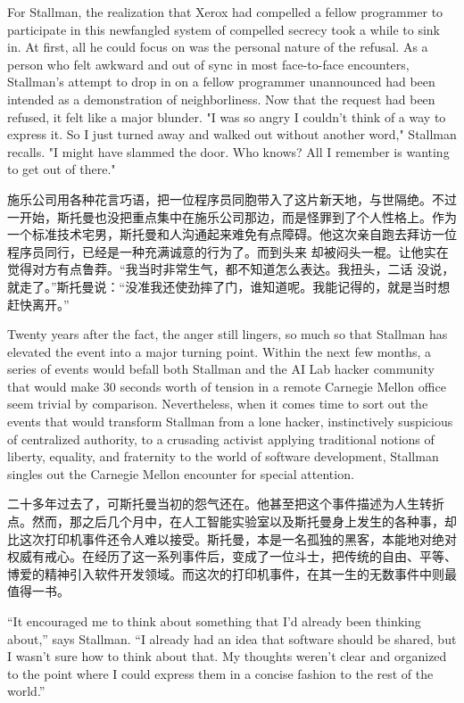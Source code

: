 \ifdefined\eng
For Stallman, the realization that Xerox had compelled a fellow programmer to participate in this newfangled system of compelled secrecy took a while to sink in. At first, all he could focus on was the personal nature of the refusal. As a person who felt awkward and out of sync in most face-to-face encounters, Stallman's attempt to drop in on a fellow programmer unannounced had been intended as a demonstration of neighborliness. Now that the request had been refused, it felt like a major blunder. "I was so angry I couldn't think of a way to express it. So I just turned away and walked out without another word," Stallman recalls. "I might have slammed the door. Who knows? All I remember is wanting to get out of there."
\fi

\ifdefined\chs
施乐公司用各种花言巧语，把一位程序员同胞带入了这片新天地，与世隔绝。不过一开始，斯托曼也没把重点集中在施乐公司那边，而是怪罪到了个人性格上。作为一个标准技术宅男，斯托曼和人沟通起来难免有点障碍。他这次亲自跑去拜访一位程序员同行，已经是一种充满诚意的行为了。而到头来
却被闷头一棍。让他实在觉得对方有点鲁莽。``我当时非常生气，都不知道怎么表达。我扭头，二话
没说，就走了。''斯托曼说：``没准我还使劲摔了门，谁知道呢。我能记得的，就是当时想赶快离开。''
\fi

\ifdefined\eng
Twenty years after the fact, the anger still lingers, so much so that Stallman has elevated the event into a major turning point. Within the next few months, a series of events would befall both Stallman and the AI Lab hacker community that would make 30 seconds worth of tension in a remote Carnegie Mellon office seem trivial by comparison. Nevertheless, when it comes time to sort out the events that would transform Stallman from a lone hacker, instinctively suspicious of centralized authority, to a crusading activist applying traditional notions of liberty, equality, and fraternity to the world of software development, Stallman singles out the Carnegie Mellon encounter for special attention.
\fi

\ifdefined\chs
二十多年过去了，可斯托曼当初的怨气还在。他甚至把这个事件描述为人生转折点。然而，那之后几个月中，在人工智能实验室以及斯托曼身上发生的各种事，却比这次打印机事件还令人难以接受。斯托曼，本是一名孤独的黑客，本能地对绝对权威有戒心。在经历了这一系列事件后，变成了一位斗士，把传统的自由、平等、博爱的精神引入软件开发领域。而这次的打印机事件，在其一生的无数事件中则最值得一书。
\fi

\ifdefined\eng
``It encouraged me to think about something that I'd already been thinking
about,'' says Stallman. ``I already had an idea that software should be shared,
but I wasn't sure how to think about that. My thoughts weren't clear and
organized to the point where I could express them in a concise fashion to the
rest of the world.'' 
\fi

